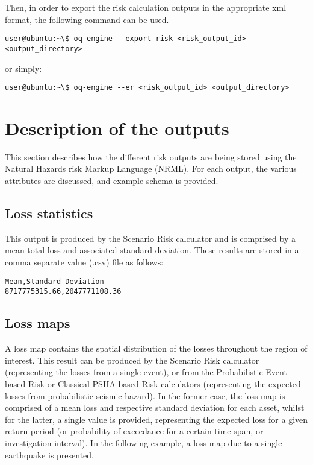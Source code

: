 Then, in order to export the risk calculation outputs in the appropriate xml format, the following command can be used.

\begin{Verbatim}[frame=single, commandchars=\\\{\}, samepage=true]
user@ubuntu:~\$ oq-engine --export-risk <risk_output_id>
<output_directory>
\end{Verbatim}

or simply:

\begin{Verbatim}[frame=single, commandchars=\\\{\}, samepage=true]
user@ubuntu:~\$ oq-engine --er <risk_output_id> <output_directory>
\end{Verbatim}

\section{Description of the outputs}
This section describes how the different risk outputs are being stored using the Natural Hazards risk Markup Language (NRML). For each output, the various attributes are discussed, and example schema is provided.

\subsection{Loss statistics}
This output is produced by the Scenario Risk calculator and is comprised by a mean total loss and associated standard deviation. These results are stored in a comma separate value (.csv) file as follows:

\begin{Verbatim}[frame=single, commandchars=\\\{\}, samepage=true]
Mean,Standard Deviation
8717775315.66,2047771108.36
\end{Verbatim}

\subsection{Loss maps}
A loss map contains the spatial distribution of the losses throughout the region of interest. This result can be produced by the Scenario Risk calculator (representing the losses from a single event), or from the Probabilistic Event-based Risk or Classical PSHA-based Risk calculators (representing the expected losses from probabilistic seismic hazard). In the former case, the loss map is comprised of a mean loss and respective standard deviation for each \gls{asset}, whilst for the latter, a single value is provided, representing the expected loss for a given return period (or probability of exceedance for a certain time span, or investigation interval). In the following example, a loss map due to a single earthquake is presented.


